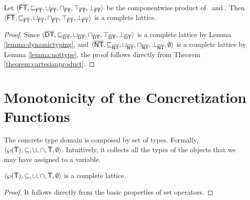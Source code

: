\documentclass{llncs}
\begin{document}
\begin{lemma}
\label{lemma:notandstaticdynamic}
Let $\langle \mathsf{\overline{FT}}, \sqsubseteq_{\mathsf{\overline{FT}}}, \sqcup_{\mathsf{\overline{FT}}}, \sqcap_{\mathsf{\overline{FT}}}, \top_{\mathsf{\overline{FT}}}, \bot_{\mathsf{\overline{FT}}} \rangle$ be the componentwise product of \dynamictype\ and \nottype.
Then $\langle \mathsf{\overline{FT}}, \sqsubseteq_{\mathsf{\overline{FT}}}, \sqcup_{\mathsf{\overline{FT}}}, \sqcap_{\mathsf{\overline{FT}}}, \top_{\mathsf{\overline{FT}}}, \bot_{\mathsf{\overline{FT}}} \rangle$ is a complete lattice.

\begin{proof}
Since $\langle \mathsf{\overline{DT}}, \sqsubseteq_{\mathsf{\overline{DT}}}, \sqcup_{\mathsf{\overline{DT}}}, \sqcap_{\mathsf{\overline{DT}}}, \top_{\mathsf{\overline{DT}}}, \bot_{\mathsf{\overline{DT}}} \rangle$ is a complete lattice by Lemma \ref{lemma:dynamictyping}, and $\langle \mathsf{\overline{NT}}, \sqsubseteq_{\mathsf{\overline{NT}}}, \sqcup_{\mathsf{\overline{NT}}}, \sqcap_{\mathsf{\overline{NT}}}, \bot_{\mathsf{\overline{NT}}}, \emptyset \rangle$ is a complete lattice by Lemma \ref{lemma:nottype}, the proof follows directly from Theorem \ref{theorem:cartesianproduct}.
\end{proof}

\end{lemma}

\section{Monotonicity of the Concretization Functions}

\begin{definition}
The concrete type domain is composed by set of types. Formally, $\langle \wp(\mathsf{\overline{T}}), \subseteq, \cup, \cap, \mathsf{\overline{T}}, \emptyset \rangle$. Intuitively, it collects all the types of the objects that we may have assigned to a variable.
\end{definition}

\begin{lemma}
$\langle \wp(\mathsf{\overline{T}}), \subseteq, \cup, \cap, \mathsf{\overline{T}}, \emptyset \rangle$ is a complete lattice.
\begin{proof}
It follows directly from the basic properties of set operators.
\end{proof}
\end{lemma}
\end{document}
